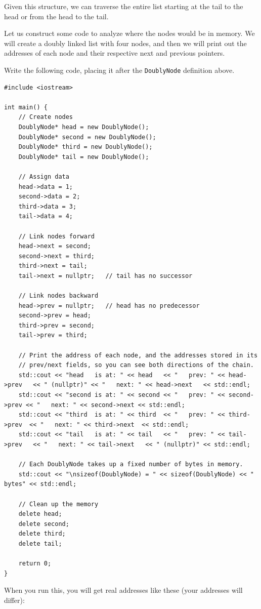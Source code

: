Given this structure, we can traverse the entire list starting at the tail to the head or from the head to the tail. 

Let us construct some code to analyze where the nodes would be in memory. We will create a doubly linked list with four nodes, and then we will print out the addresses of each node and their respective next and previous pointers.

Write the following code, placing it after the \texttt{DoublyNode} definition above.
\begin{verbatim}
#include <iostream>

int main() {
    // Create nodes
    DoublyNode* head = new DoublyNode();
    DoublyNode* second = new DoublyNode();
    DoublyNode* third = new DoublyNode();
    DoublyNode* tail = new DoublyNode();

    // Assign data
    head->data = 1;
    second->data = 2;
    third->data = 3;
    tail->data = 4;

    // Link nodes forward
    head->next = second;
    second->next = third;
    third->next = tail;
    tail->next = nullptr;   // tail has no successor

    // Link nodes backward
    head->prev = nullptr;   // head has no predecessor
    second->prev = head;
    third->prev = second;
    tail->prev = third;

    // Print the address of each node, and the addresses stored in its
    // prev/next fields, so you can see both directions of the chain.
    std::cout << "head   is at: " << head   << "   prev: " << head->prev   << " (nullptr)" << "   next: " << head->next   << std::endl;
    std::cout << "second is at: " << second << "   prev: " << second->prev << "   next: " << second->next << std::endl;
    std::cout << "third  is at: " << third  << "   prev: " << third->prev  << "   next: " << third->next  << std::endl;
    std::cout << "tail   is at: " << tail   << "   prev: " << tail->prev   << "   next: " << tail->next   << " (nullptr)" << std::endl;

    // Each DoublyNode takes up a fixed number of bytes in memory.
    std::cout << "\nsizeof(DoublyNode) = " << sizeof(DoublyNode) << " bytes" << std::endl;

    // Clean up the memory
    delete head;
    delete second;
    delete third;
    delete tail;

    return 0;
}
\end{verbatim}

When you run this, you will get real addresses like these (your addresses will differ):

